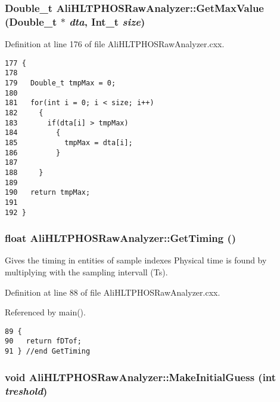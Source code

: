 \subsubsection{\setlength{\rightskip}{0pt plus 5cm}Double\_\-t Ali\-HLTPHOSRaw\-Analyzer::Get\-Max\-Value (Double\_\-t $\ast$ {\em dta}, Int\_\-t {\em size})\hspace{0.3cm}{\tt  [inherited]}}\label{classAliHLTPHOSRawAnalyzer_AliHLTPHOSRawAnalyzerPeakFindera18}




Definition at line 176 of file Ali\-HLTPHOSRaw\-Analyzer.cxx.

\footnotesize\begin{verbatim}177 {
178 
179   Double_t tmpMax = 0;
180 
181   for(int i = 0; i < size; i++)
182     {
183       if(dta[i] > tmpMax)
184         {
185           tmpMax = dta[i];
186         }
187 
188     }
189   
190   return tmpMax;
191 
192 }
\end{verbatim}\normalsize 


\subsubsection{\setlength{\rightskip}{0pt plus 5cm}float Ali\-HLTPHOSRaw\-Analyzer::Get\-Timing ()\hspace{0.3cm}{\tt  [inherited]}}\label{classAliHLTPHOSRawAnalyzer_AliHLTPHOSRawAnalyzerPeakFindera10}


Gives the timing in entities of sample indexes Physical time is found by multiplying with the sampling intervall (Ts). 

Definition at line 88 of file Ali\-HLTPHOSRaw\-Analyzer.cxx.

Referenced by main().

\footnotesize\begin{verbatim}89 {
90   return fDTof;
91 } //end GetTiming
\end{verbatim}\normalsize 


\subsubsection{\setlength{\rightskip}{0pt plus 5cm}void Ali\-HLTPHOSRaw\-Analyzer::Make\-Initial\-Guess (int {\em treshold})\hspace{0.3cm}{\tt  [inherited]}}\label{classAliHLTPHOSRawAnalyzer_AliHLTPHOSRawAnalyzerPeakFindera16}



